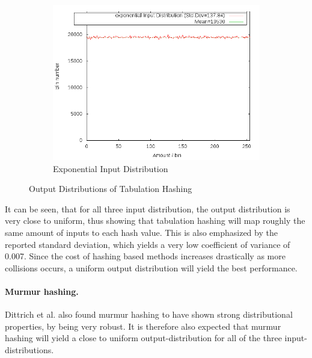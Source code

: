 \documentclass[11pt]{article} %
\begin{document}
\begin{figure}[H]\ContinuedFloat
  \centering
  \begin{subfigure}[b]{0.9\textwidth}
    \includegraphics[width=\textwidth]{Graphs/Dist/Tabulation_exponential_dist.png}
    \caption{Exponential Input Distribution}
    \label{fig:tab_dist_exp}
  \end{subfigure}
  \caption{Output Distributions of Tabulation Hashing}\label{fig:tab_dist}
\end{figure}

It can be seen, that for all three input distribution, the output distribution is very close to uniform, thus showing that tabulation hashing will map roughly the same amount of inputs to each hash value. This is also emphasized by the reported standard deviation, which yields a very low coefficient of variance of 0.007. Since the cost of hashing based methods increases drastically as more collisions occurs, a uniform output distribution will yield the best performance. 

\paragraph{Murmur hashing.} Dittrich et al. also found murmur hashing to have shown strong distributional properties, by being very robust. It is therefore also expected that murmur hashing will yield a close to uniform output-distribution for all of the three input-distributions.\\
\end{document}
